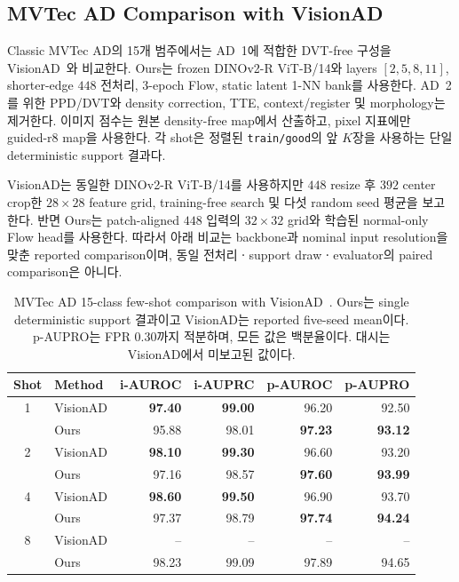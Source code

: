 \subsection{MVTec AD Comparison with VisionAD}

Classic MVTec AD의 15개 범주에서는 AD~1에 적합한 DVT-free 구성을
VisionAD~\cite{wang2025visionad}와 비교한다. Ours는 frozen DINOv2-R
ViT-B/14와 layers $[2,5,8,11]$, shorter-edge $448$ 전처리, 3-epoch Flow,
static latent 1-NN bank를 사용한다. AD~2를 위한 PPD/DVT와 density correction,
TTE, context/register 및 morphology는 제거한다. 이미지 점수는 원본 density-free
map에서 산출하고, pixel 지표에만 guided-r8 map을 사용한다. 각 shot은 정렬된
\texttt{train/good}의 앞 $K$장을 사용하는 단일 deterministic support 결과다.

VisionAD는 동일한 DINOv2-R ViT-B/14를 사용하지만 $448$ resize 후 $392$
center crop한 $28\!\times\!28$ feature grid, training-free search 및 다섯
random seed 평균을 보고한다. 반면 Ours는 patch-aligned $448$ 입력의
$32\!\times\!32$ grid와 학습된 normal-only Flow head를 사용한다. 따라서 아래
비교는 backbone과 nominal input resolution을 맞춘 reported comparison이며,
동일 전처리ㆍsupport drawㆍevaluator의 paired comparison은 아니다.

\begin{table}[t]
  \centering
  \caption{MVTec AD 15-class few-shot comparison with
  VisionAD~\cite{wang2025visionad}. Ours는 single deterministic support
  결과이고 VisionAD는 reported five-seed mean이다. p-AUPRO는 FPR 0.30까지
  적분하며, 모든 값은 백분율이다. 대시는 VisionAD에서 미보고된 값이다.}
  \label{tab:mvtecad1_visionad_aligned}
  \small
  \begin{tabular}{@{}clrrrr@{}}
    \toprule
    Shot & Method & i-AUROC & i-AUPRC & p-AUROC & p-AUPRO \\
    \midrule
    1 & VisionAD & \textbf{97.40} & \textbf{99.00} & 96.20 & 92.50 \\
      & Ours     & 95.88 & 98.01 & \textbf{97.23} & \textbf{93.12} \\
    \midrule
    2 & VisionAD & \textbf{98.10} & \textbf{99.30} & 96.60 & 93.20 \\
      & Ours     & 97.16 & 98.57 & \textbf{97.60} & \textbf{93.99} \\
    \midrule
    4 & VisionAD & \textbf{98.60} & \textbf{99.50} & 96.90 & 93.70 \\
      & Ours     & 97.37 & 98.79 & \textbf{97.74} & \textbf{94.24} \\
    \midrule
    8 & VisionAD & -- & -- & -- & -- \\
      & Ours     & 98.23 & 99.09 & 97.89 & 94.65 \\
    \bottomrule
  \end{tabular}
\end{table}

